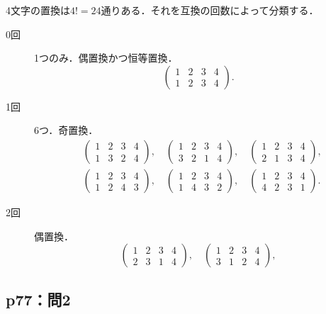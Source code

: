 \documentclass[uplatex,dvipdfmx,a4paper,11pt,fleqn]{jsarticle}
\begin{document}
\begin{tleftbar}
    4文字の置換は$4!=24$通りある．それを互換の回数によって分類する．
    \begin{description}
        \item[0回] 1つのみ．偶置換かつ恒等置換．
        \[
            \begin{pmatrix} 1 & 2 & 3 &4 \\ 1 & 2 & 3 &4\end{pmatrix}.
        \]
        \item [1回] 6つ．奇置換．
        \begin{align*}
            & \begin{pmatrix} 1 & 2 & 3 & 4\\ 1 & 3 & 2 & 4\end{pmatrix},\quad 
            \begin{pmatrix} 1 & 2 & 3 &4 \\ 3 & 2 & 1  & 4\end{pmatrix},\quad 
            \begin{pmatrix} 1 & 2 & 3 & 4\\ 2 & 1 & 3 & 4\end{pmatrix},\\
            & \begin{pmatrix} 1 & 2 & 3 & 4\\ 1 & 2 & 4 & 3\end{pmatrix},\quad 
            \begin{pmatrix} 1 & 2 & 3 & 4\\ 1 & 4 & 3 & 2\end{pmatrix},\quad 
            \begin{pmatrix} 1 & 2 & 3 & 4\\ 4 & 2 & 3 & 1\end{pmatrix}.
    \end{align*}
        \item [2回] 偶置換．
        \[
            \begin{pmatrix} 1 & 2 & 3 & 4 \\ 2 & 3 & 1 & 4\end{pmatrix},\quad 
            \begin{pmatrix} 1 & 2 & 3 & 4 \\ 3 & 1 & 2 & 4 \end{pmatrix},
        \]
    \end{description}
\end{tleftbar}

\subsection*{p77：問2}
\end{document}
